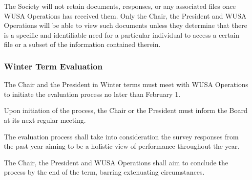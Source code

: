 The Society will not retain documents, responses, or any associated files once WUSA Operations has received them. Only the Chair, the President and WUSA Operations will be able to view such documents unless they determine that there is a specific and identifiable need for a particular individual to access a certain file or a subset of the
information contained therein.

\subsubsection{Winter Term Evaluation}
The Chair and the President in Winter terms must meet with WUSA Operations to initiate the evaluation process no later than February 1. 

Upon initiation of the process, the Chair or the President must inform the Board at its next regular meeting.

The evaluation process shall take into consideration the survey responses from the past year aiming to be a holistic view of performance throughout the year.

The Chair, the President and WUSA Operations shall aim to conclude the process by the end of the term, barring extenuating circumstances.

